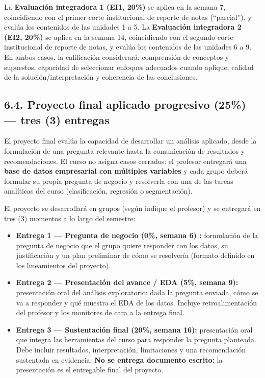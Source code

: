 \documentclass[11pt,a4paper]{article}
\begin{document}
\vspace{0.3cm}

La \textbf{Evaluación integradora 1 (EI1, 20\%)} se aplica en la semana 7, coincidiendo con el primer corte institucional de reporte de notas (``parcial''), y evalúa los contenidos de las unidades 1 a 5. La \textbf{Evaluación integradora 2 (EI2, 20\%)} se aplica en la semana 14, coincidiendo con el segundo corte institucional de reporte de notas, y evalúa los contenidos de las unidades 6 a 9. En ambos casos, la calificación considerará: comprensión de conceptos y supuestos, capacidad de seleccionar enfoques adecuados cuando aplique, calidad de la solución/interpretación y coherencia de las conclusiones.

\subsection*{6.4. Proyecto final aplicado progresivo (25\%) --- tres (3) entregas}

El proyecto final evalúa la capacidad de desarrollar un análisis aplicado, desde la formulación de una pregunta relevante hasta la comunicación de resultados y recomendaciones. El curso no asigna casos cerrados: el profesor entregará una \textbf{base de datos empresarial con múltiples variables} y cada grupo deberá formular su propia pregunta de negocio y resolverla con una de las tareas analíticas del curso (clasificación, regresión o segmentación).

\vspace{0.3cm}

El proyecto se desarrollará en grupos (según indique el profesor) y se entregará en tres (3) momentos a lo largo del semestre:

\begin{itemize}
    \item \textbf{Entrega 1 --- Pregunta de negocio (0\%, semana 6) :} formulación de la pregunta de negocio que el grupo quiere responder con los datos, su justificación y un plan preliminar de cómo se resolvería (formato definido en los lineamientos del proyecto).
    \item \textbf{Entrega 2 --- Presentación del avance / EDA (5\%, semana 9):} presentación oral del análisis exploratorio: dada la pregunta enviada, cómo se va a responder y qué muestra el EDA de los datos. Incluye retroalimentación del profesor y los monitores de cara a la entrega final.
    \item \textbf{Entrega 3 --- Sustentación final (20\%, semana 16):} presentación oral que integra las herramientas del curso para responder la pregunta planteada. Debe incluir resultados, interpretación, limitaciones y una recomendación sustentada en evidencia. \textbf{No se entrega documento escrito:} la presentación es el entregable final del proyecto.
\end{itemize}
\end{document}

